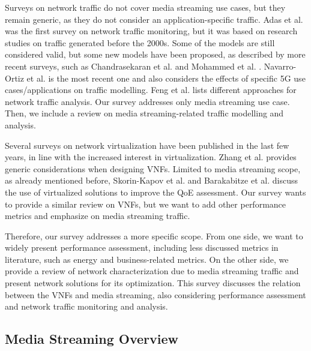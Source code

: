 Surveys on network traffic do not cover media streaming use cases, but they remain generic, as they do not consider an application-specific traffic. Adas et al. \cite{Adas1997} was the first survey on network traffic monitoring, but it was based on research studies on traffic generated before the 2000s. Some of the models are still considered valid, but some new models have been proposed, as described by more recent surveys, such as Chandrasekaran et al. \cite{Chandrasekaran2009} and Mohammed et al. \cite{Mohammed2011}. Navarro-Ortiz et al. \cite{Navarro-Ortiz2020} is the most recent one and also considers the effects of specific 5G use cases/applications on traffic modelling. Feng et al. \cite{Feng2005} lists different approaches for network traffic analysis. Our survey addresses only media streaming use case. Then, we include a review on media streaming-related traffic modelling and analysis.

Several surveys on network virtualization have been published in the last few years,
in line with the increased interest in virtualization.
Zhang et al. \cite{Zhang2019} provides generic considerations when designing VNFs. Limited to media streaming scope, as already mentioned before, Skorin-Kapov et al. \cite{Skorin-Kapov2018} and Barakabitze et al. \cite{Barakabitze2019-2} discuss the use of virtualized solutions to improve the QoE assessment. Our survey wants to provide a similar review on VNFs, but we want to add other performance metrics and emphasize on media streaming traffic.

Therefore, our survey addresses a more specific scope. From one side, we want to widely present performance assessment, including less discussed metrics in literature, such as energy and business-related metrics. On the other side, we provide a review of network characterization due to media streaming traffic and present network solutions for its optimization. This survey discusses the relation between the VNFs and media streaming, also considering performance assessment and network traffic monitoring and analysis.


\subsection{Media Streaming Overview}
\label{sec:IEEECOMSToverview}

